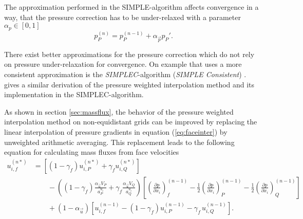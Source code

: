 The approximation performed in the SIMPLE-algorithm affects convergence in a way, that the pressure correction has to be under-relaxed with a parameter \(\alpha_p \in [0,1]\)
\begin{equation}
  \label{eq:pressupdate}
  p_P^{(n)} = p_P^{(n-1)} + \alpha_{\vec{p}} p_P'.
\end{equation}

There exist better approximations for the pressure correction which do not rely on pressure under-relaxation for convergence. On example that uses a more consistent approximation is the \emph{SIMPLEC}-algorithm (\emph{SIMPLE Consistent}) \cite{doormaal84}. \cite{miller88} gives a similar derivation of the pressure weighted interpolation method and its implementation in the SIMPLEC-algorithm.

As shown in section \ref{sec:massflux}, the behavior of the pressure weighted interpolation method on non-equidistant grids can be improved by replacing the linear interpolation of pressure gradients in equation (\ref{eq:faceinter}) by unweighted arithmetic averaging. This replacement leads to the following equation for calculating mass fluxes from face velocities
\begin{align}
  \label{eq:facecorr2}
  u_{i,f}^{(n*)} 
  &=
  \left[\left(1 - \gamma_f\right) u_{i,P}^{(n*)} + \gamma_f u_{i,Q}^{(n*)} \right] \nonumber\\[1em]
  &\quad\quad - 
  \left(\left(1 - \gamma_f\right) \frac{\alpha_\vec{u} V_P}{a_P^{u_i}} + \gamma_f \frac{\alpha_\vec{u} V_Q}{a_Q^{u_i}}\right)
  \left[ 
  \left(\frac{\partial p}{\partial x_i}\right)_f^{(n-1)} 
  -  \frac{1}{2} \left( \frac{\partial p}{\partial x_i} \right)_P^{(n-1)} 
  -  \frac{1}{2} \left(\frac{\partial p}{\partial x_i}\right)_Q^{(n-1)} 
  \right] \nonumber \\[1em]
  &\quad\quad + \left(1 - \alpha_\vec{u}\right) \left[ u_{i,f}^{(n-1)} - \left(1 - \gamma_f\right) u_{i,P}^{(n-1)} - \gamma_f \, u_{i,Q}^{(n-1)} \right].
\end{align}

